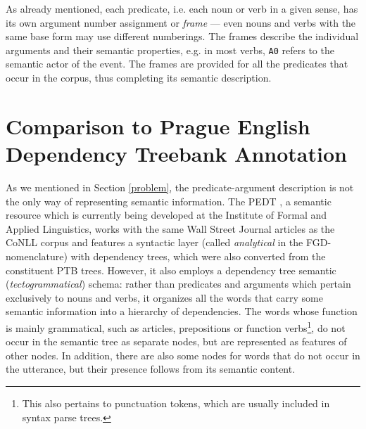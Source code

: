 \documentclass[12pt,notitlepage]{report}
\begin{document}
As already mentioned, each predicate, i.e. each noun or verb in a given sense, has its own argument number assignment or \emph{frame} --- even nouns and verbs with the same base form may use different numberings. The frames describe the individual arguments and their semantic properties, e.g. in most verbs, \texttt{A0} refers to the semantic actor of the event. The frames are provided for all the predicates that occur in the corpus, thus completing its semantic description.

\section{Comparison to Prague English Dependency Treebank Annotation}

As we mentioned in Section \ref{problem}, the predicate-argument description is not the only way of representing semantic information. The PEDT \cite{cinkova09}, a semantic resource which is currently being developed at the Institute of Formal and Applied Linguistics, works with the same Wall Street Journal articles as the CoNLL corpus and features a syntactic layer (called \emph{analytical} in the FGD-nomenclature) with dependency trees, which were also converted from the constituent PTB trees. However, it also employs a dependency tree semantic (\emph{tectogrammatical}) schema: rather than predicates and arguments which pertain exclusively to nouns and verbs, it organizes all the words that carry some semantic information into a hierarchy of dependencies. The words whose function is mainly grammatical, such as articles, prepositions or function verbs\footnote{This also pertains to punctuation tokens, which are usually included in syntax parse trees.}, do not occur in the semantic tree as separate nodes, but are represented as features of other nodes. In addition, there are also some nodes for words that do not occur in the utterance, but their presence follows from its semantic content. 
\end{document}
